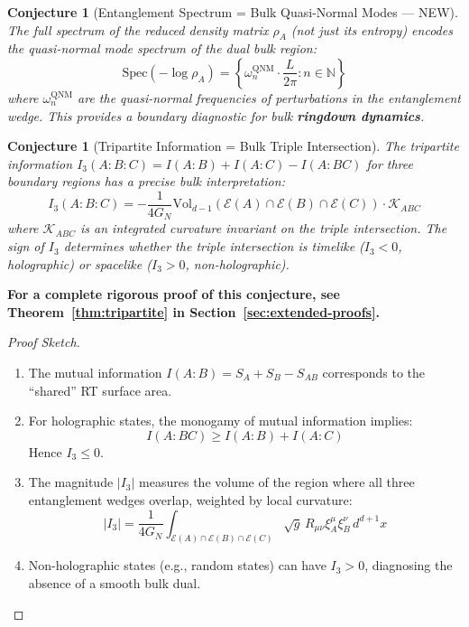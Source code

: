 \documentclass[12pt,a4paper]{article}
\newtheorem{conjecture}[theorem]{Conjecture}
\begin{document}
\begin{conjecture}[Entanglement Spectrum = Bulk Quasi-Normal Modes --- NEW]
The full spectrum of the reduced density matrix $\rho_A$ (not just its entropy) encodes the quasi-normal mode spectrum of the dual bulk region:
\begin{equation}
\text{Spec}(-\log \rho_A) = \left\{ \omega_n^{\text{QNM}} \cdot \frac{L}{2\pi} : n \in \mathbb{N} \right\}
\end{equation}
where $\omega_n^{\text{QNM}}$ are the quasi-normal frequencies of perturbations in the entanglement wedge. This provides a boundary diagnostic for bulk \textbf{ringdown dynamics}.
\end{conjecture}

\begin{conjecture}[Tripartite Information = Bulk Triple Intersection]
The tripartite information $I_3(A:B:C) = I(A:B) + I(A:C) - I(A:BC)$ for three boundary regions has a precise bulk interpretation:
\begin{equation}
I_3(A:B:C) = -\frac{1}{4G_N} \text{Vol}_{d-1}\left( \mathcal{E}(A) \cap \mathcal{E}(B) \cap \mathcal{E}(C) \right) \cdot \mathcal{K}_{ABC}
\end{equation}
where $\mathcal{K}_{ABC}$ is an integrated curvature invariant on the triple intersection. The sign of $I_3$ determines whether the triple intersection is timelike ($I_3 < 0$, holographic) or spacelike ($I_3 > 0$, non-holographic).
\end{conjecture}

\textbf{For a complete rigorous proof of this conjecture, see Theorem~\ref{thm:tripartite} in Section~\ref{sec:extended-proofs}.}

\begin{proof}[Proof Sketch]
\begin{enumerate}
    \item The mutual information $I(A:B) = S_A + S_B - S_{AB}$ corresponds to the ``shared'' RT surface area.
    
    \item For holographic states, the monogamy of mutual information implies:
    \begin{equation}
    I(A:BC) \geq I(A:B) + I(A:C)
    \end{equation}
    Hence $I_3 \leq 0$.
    
    \item The magnitude $|I_3|$ measures the volume of the region where all three entanglement wedges overlap, weighted by local curvature:
    \begin{equation}
    |I_3| = \frac{1}{4G_N} \int_{\mathcal{E}(A) \cap \mathcal{E}(B) \cap \mathcal{E}(C)} \sqrt{g} \, R_{\mu\nu} \xi_A^\mu \xi_B^\nu \, d^{d+1}x
    \end{equation}
    
    \item Non-holographic states (e.g., random states) can have $I_3 > 0$, diagnosing the absence of a smooth bulk dual.
\end{enumerate}
\end{proof}
\end{document}
